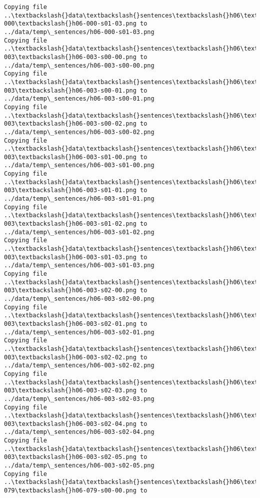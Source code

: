 \documentclass[11pt]{article}
\begin{document}
\begin{Verbatim}[commandchars=\\\{\}]
Copying file ..\textbackslash{}data\textbackslash{}sentences\textbackslash{}h06\textbackslash{}h06-000\textbackslash{}h06-000-s01-03.png to
../data/temp\_sentences/h06-000-s01-03.png
Copying file ..\textbackslash{}data\textbackslash{}sentences\textbackslash{}h06\textbackslash{}h06-003\textbackslash{}h06-003-s00-00.png to
../data/temp\_sentences/h06-003-s00-00.png
Copying file ..\textbackslash{}data\textbackslash{}sentences\textbackslash{}h06\textbackslash{}h06-003\textbackslash{}h06-003-s00-01.png to
../data/temp\_sentences/h06-003-s00-01.png
Copying file ..\textbackslash{}data\textbackslash{}sentences\textbackslash{}h06\textbackslash{}h06-003\textbackslash{}h06-003-s00-02.png to
../data/temp\_sentences/h06-003-s00-02.png
Copying file ..\textbackslash{}data\textbackslash{}sentences\textbackslash{}h06\textbackslash{}h06-003\textbackslash{}h06-003-s01-00.png to
../data/temp\_sentences/h06-003-s01-00.png
Copying file ..\textbackslash{}data\textbackslash{}sentences\textbackslash{}h06\textbackslash{}h06-003\textbackslash{}h06-003-s01-01.png to
../data/temp\_sentences/h06-003-s01-01.png
Copying file ..\textbackslash{}data\textbackslash{}sentences\textbackslash{}h06\textbackslash{}h06-003\textbackslash{}h06-003-s01-02.png to
../data/temp\_sentences/h06-003-s01-02.png
Copying file ..\textbackslash{}data\textbackslash{}sentences\textbackslash{}h06\textbackslash{}h06-003\textbackslash{}h06-003-s01-03.png to
../data/temp\_sentences/h06-003-s01-03.png
Copying file ..\textbackslash{}data\textbackslash{}sentences\textbackslash{}h06\textbackslash{}h06-003\textbackslash{}h06-003-s02-00.png to
../data/temp\_sentences/h06-003-s02-00.png
Copying file ..\textbackslash{}data\textbackslash{}sentences\textbackslash{}h06\textbackslash{}h06-003\textbackslash{}h06-003-s02-01.png to
../data/temp\_sentences/h06-003-s02-01.png
Copying file ..\textbackslash{}data\textbackslash{}sentences\textbackslash{}h06\textbackslash{}h06-003\textbackslash{}h06-003-s02-02.png to
../data/temp\_sentences/h06-003-s02-02.png
Copying file ..\textbackslash{}data\textbackslash{}sentences\textbackslash{}h06\textbackslash{}h06-003\textbackslash{}h06-003-s02-03.png to
../data/temp\_sentences/h06-003-s02-03.png
Copying file ..\textbackslash{}data\textbackslash{}sentences\textbackslash{}h06\textbackslash{}h06-003\textbackslash{}h06-003-s02-04.png to
../data/temp\_sentences/h06-003-s02-04.png
Copying file ..\textbackslash{}data\textbackslash{}sentences\textbackslash{}h06\textbackslash{}h06-003\textbackslash{}h06-003-s02-05.png to
../data/temp\_sentences/h06-003-s02-05.png
Copying file ..\textbackslash{}data\textbackslash{}sentences\textbackslash{}h06\textbackslash{}h06-079\textbackslash{}h06-079-s00-00.png to

\end{Verbatim}
\end{document}
